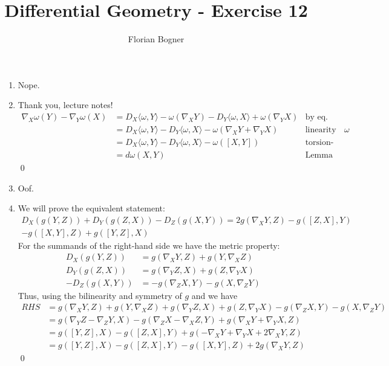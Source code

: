 \documentclass[a4paper,11pt,notitlepage,fullpage]{article}
\begin{document}
\author{Florian Bogner}
\title{Differential Geometry - Exercise 12}
\maketitle


\begin{enumerate}
\item Nope.

\item Thank you, lecture notes!
\begin{align*}
\nabla_X\omega(Y) - \nabla_Y\omega(X) &= D_X\langle\omega, Y\rangle - \omega(\nabla_X Y) - D_Y\langle\omega, X\rangle + \omega(\nabla_Y X) &\text{by eq. (42)} \\
&= D_X\langle\omega, Y\rangle - D_Y\langle\omega, X\rangle - \omega(\nabla_X Y + \nabla_Y X) &\text{linearity of }\omega \\
&= D_X\langle\omega, Y\rangle - D_Y\langle\omega, X\rangle - \omega([X, Y]) &\text{torsion-free} \\
&= d\omega(X, Y) &\text{Lemma 5.59}
\end{align*}
\qed

\item Oof.

\item We will prove the equivalent statement:
\begin{multline*}
D_X(g(Y,Z)) + D_Y(g(Z,X)) - D_Z(g(X,Y)) = 2 g(\nabla_X Y, Z) - g([Z, X], Y) \\- g([X, Y], Z) + g([Y, Z], X)
\end{multline*}
For the summands of the right-hand side we have the metric property:
\begin{align*}
D_X(g(Y,Z)) &= g(\nabla_X Y, Z) + g(Y, \nabla_X Z) \\
D_Y(g(Z,X)) &= g(\nabla_Y Z, X) + g(Z, \nabla_Y X) \\
- D_Z(g(X,Y)) &= - g(\nabla_Z X, Y) - g(X, \nabla_Z Y)
\end{align*}
Thus, using the bilinearity and symmetry of $g$ and  we have
\begin{align*}
RHS &= g(\nabla_X Y, Z) + g(Y, \nabla_X Z) + g(\nabla_Y Z, X) + g(Z, \nabla_Y X) - g(\nabla_Z X, Y) - g(X, \nabla_Z Y) \\
&= g(\nabla_Y Z - \nabla_Z Y, X) - g(\nabla_Z X - \nabla_X Z, Y) + g(\nabla_X Y + \nabla_Y X, Z) \\
&= g([Y, Z], X) - g([Z, X], Y) + g(- \nabla_X Y + \nabla_Y X + 2 \nabla_X Y, Z) \\
&= g([Y, Z], X) - g([Z, X], Y) - g([X, Y], Z) + 2 g(\nabla_X Y, Z)
\end{align*}
\qed

\end{enumerate}
\end{document}
